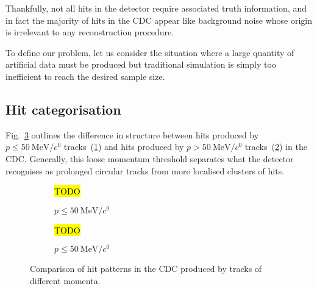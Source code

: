 Thankfully, not all hits in the detector require associated truth information, and in fact the majority of hits in the CDC appear like background noise whose origin is irrelevant to any reconstruction procedure. %

To define our problem, let us consider the situation where a large quantity of artificial data must be produced but traditional simulation is simply too inefficient to reach the desired sample size.

\subsection{Hit categorisation}
Fig.~\ref{fig:cdc_rconst_vs_noise} outlines the difference in structure between hits produced by $p\leq\SI{50}{\MeV/\clight}$ tracks~(\ref{fig:cdc_rconst_vs_noise:low}) and hits produced by $p>\SI{50}{\MeV/\clight}$ tracks~(\ref{fig:cdc_rconst_vs_noise:high}) in the CDC. Generally, this loose momentum threshold separates what the detector recognises as prolonged circular tracks from more localised clusters of hits.

\begin{figure}
    \centering
    \begin{subfigure}{0.4\textwidth}
        \centering
        \hl{TODO}
        \caption{$p\leq\SI{50}{\MeV/\clight}$}
        \label{fig:cdc_rconst_vs_noise:low}
    \end{subfigure}
    \hfill
    \begin{subfigure}{0.4\textwidth}
        \centering
        \hl{TODO}
        \caption{$p\leq\SI{50}{\MeV/\clight}$}
        \label{fig:cdc_rconst_vs_noise:high}
    \end{subfigure}
    \caption{Comparison of hit patterns in the CDC produced by tracks of different momenta.}
    \label{fig:cdc_rconst_vs_noise}
\end{figure}

